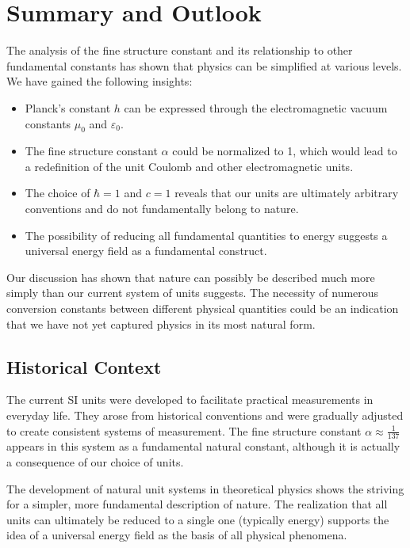\documentclass{article}
\begin{document}
\section{Summary and Outlook}

The analysis of the fine structure constant and its relationship to other fundamental constants has shown that physics can be simplified at various levels. We have gained the following insights:

\begin{itemize}
	\item Planck's constant $h$ can be expressed through the electromagnetic vacuum constants $\mu_0$ and $\varepsilon_0$.
	\item The fine structure constant $\alpha$ could be normalized to 1, which would lead to a redefinition of the unit Coulomb and other electromagnetic units.
	\item The choice of $\hbar = 1$ and $c = 1$ reveals that our units are ultimately arbitrary conventions and do not fundamentally belong to nature.
	\item The possibility of reducing all fundamental quantities to energy suggests a universal energy field as a fundamental construct.
\end{itemize}

Our discussion has shown that nature can possibly be described much more simply than our current system of units suggests. The necessity of numerous conversion constants between different physical quantities could be an indication that we have not yet captured physics in its most natural form.

\subsection{Historical Context}

The current SI units were developed to facilitate practical measurements in everyday life. They arose from historical conventions and were gradually adjusted to create consistent systems of measurement. The fine structure constant $\alpha \approx \frac{1}{137}$ appears in this system as a fundamental natural constant, although it is actually a consequence of our choice of units.

The development of natural unit systems in theoretical physics shows the striving for a simpler, more fundamental description of nature. The realization that all units can ultimately be reduced to a single one (typically energy) supports the idea of a universal energy field as the basis of all physical phenomena.
\end{document}
